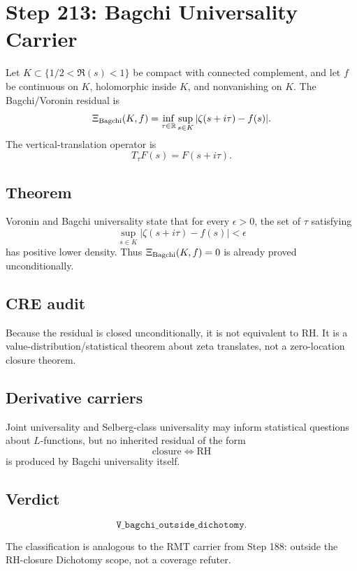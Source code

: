 \documentclass[11pt]{article}
\begin{document}
\section*{Step 213: Bagchi Universality Carrier}

Let \(K\subset\{1/2<\Re(s)<1\}\) be compact with connected complement, and let
\(f\) be continuous on \(K\), holomorphic inside \(K\), and nonvanishing on
\(K\).  The Bagchi/Voronin residual is
\[
  \Xi_{\rm Bagchi}(K,f)
  =\inf_{\tau\in\mathbb R}\sup_{s\in K}
  |\zeta(s+i\tau)-f(s)|.
\]
The vertical-translation operator is
\[
  T_\tau F(s)=F(s+i\tau).
\]

\subsection*{Theorem}

Voronin and Bagchi universality state that for every \(\epsilon>0\), the set
of \(\tau\) satisfying
\[
  \sup_{s\in K}|\zeta(s+i\tau)-f(s)|<\epsilon
\]
has positive lower density.  Thus \(\Xi_{\rm Bagchi}(K,f)=0\) is already
proved unconditionally.

\subsection*{CRE audit}

Because the residual is closed unconditionally, it is not equivalent to RH.
It is a value-distribution/statistical theorem about zeta translates, not a
zero-location closure theorem.

\subsection*{Derivative carriers}

Joint universality and Selberg-class universality may inform statistical
questions about \(L\)-functions, but no inherited residual of the form
\[
\text{closure} \Longleftrightarrow \mathrm{RH}
\]
is produced by Bagchi universality itself.

\subsection*{Verdict}

\[
\boxed{\texttt{V\_bagchi\_outside\_dichotomy}.}
\]

The classification is analogous to the RMT carrier from Step 188: outside the
RH-closure Dichotomy scope, not a coverage refuter.
\end{document}
